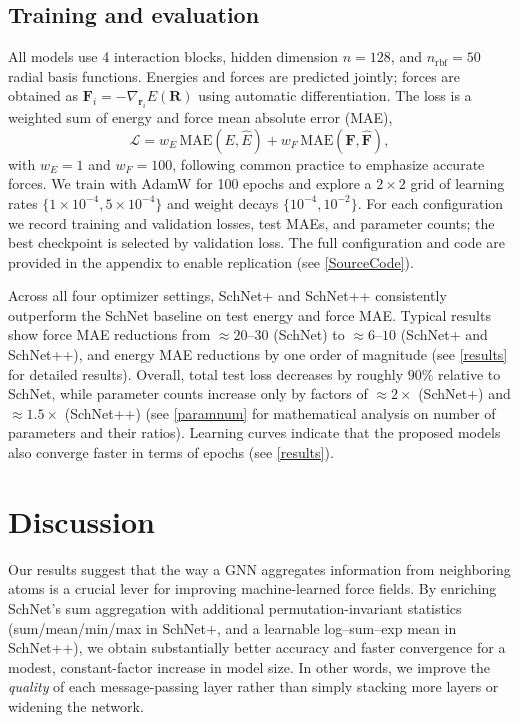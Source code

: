 \documentclass[sigconf, nonacm]{acmart}
\begin{document}
\subsection{Training and evaluation}

All models use 4 interaction blocks, hidden dimension $n=128$, and $n_{\text{rbf}}=50$ radial basis functions. Energies and forces are predicted jointly; forces are obtained as
$\mathbf{F}_i = -\nabla_{\mathbf{r}_i} E(\mathbf{R})$ using automatic differentiation. The loss is a weighted sum of energy and force mean absolute error (MAE),
\begin{equation}
	\mathcal{L} = w_E\,\mathrm{MAE}(E,\hat{E}) + w_F\,\mathrm{MAE}(\mathbf{F},\hat{\mathbf{F}}),
\end{equation}
with $w_E = 1$ and $w_F = 100$, following common practice to emphasize accurate forces.
We train with AdamW for 100 epochs and explore a $2\times2$ grid of learning rates
$\{1\!\times\!10^{-4}, 5\!\times\!10^{-4}\}$ and weight decays $\{10^{-4}, 10^{-2}\}$.
For each configuration we record training and validation losses, test MAEs, and parameter counts; the best checkpoint is selected by validation loss. The full configuration and code are provided in the appendix to enable replication (see \ref{SourceCode}).

Across all four optimizer settings, SchNet+ and SchNet++ consistently outperform the SchNet baseline on test energy and force MAE. Typical results show force MAE reductions from $\approx 20$--$30$ (SchNet) to $\approx 6$--$10$ (SchNet+ and SchNet++), and energy MAE reductions by one order of magnitude (see \ref{results} for detailed results). Overall, total test loss decreases by roughly $90\%$ relative to SchNet, while parameter counts increase only by factors of $\approx 2\times$ (SchNet+) and $\approx 1.5\times$ (SchNet++) (see \ref{paramnum} for mathematical analysis on number of parameters and their ratios). Learning curves indicate that the proposed models also converge faster in terms of epochs (see \ref{results}).

\section{Discussion}

Our results suggest that the way a GNN aggregates information from neighboring atoms is a crucial lever for improving machine-learned force fields. By enriching SchNet’s sum aggregation with additional permutation-invariant statistics (sum/mean/min/max in SchNet+, and a learnable log–sum–exp mean in SchNet++), we obtain substantially better accuracy and faster convergence for a modest, constant-factor increase in model size. In other words, we improve the \emph{quality} of each message-passing layer rather than simply stacking more layers or widening the network.
\end{document}
